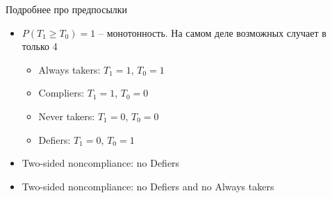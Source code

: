 \begin{frame}{Подробнее про предпосылки}
\begin{itemize}
    \item $P(T_1 \geq T_0) = 1$ -- монотонность. На самом деле возможных случает в только 4
    \begin{itemize}
        \item Always takers: $T_1 = 1$, $T_0 = 1$
        \item Compliers: $T_1 = 1$, $T_0 = 0$
        \item Never takers: $T_1 = 0$, $T_0 = 0$
        \item Defiers: $T_1 = 0$, $T_0 = 1$
    \end{itemize}
\end{itemize}
\pause
\begin{itemize}
        \item Two-sided noncompliance: no Defiers
        \item Two-sided noncompliance: no Defiers and no Always takers
    \end{itemize}
\end{frame}



